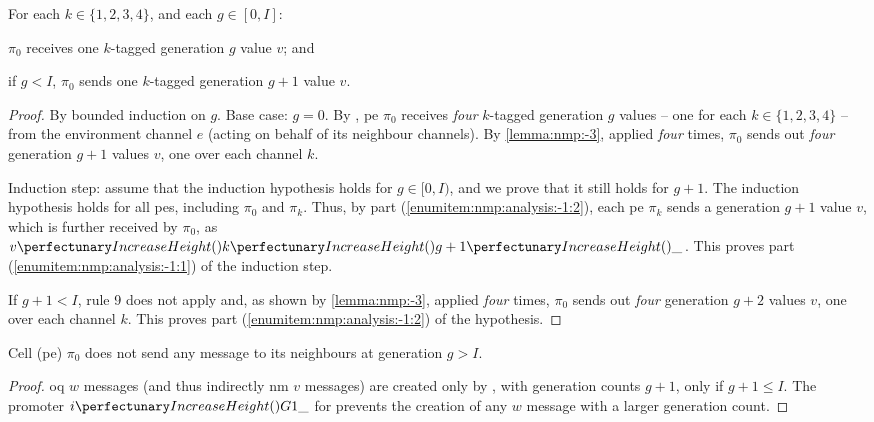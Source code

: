 \begin{theorem}\label{theorem:nmp:-1}
    For each $k \in \{ 1, 2, 3, 4 \}$, and each $g \in [0, I]$:
    \begin{inparaenum}[(i)]
        \item\label{enumitem:nmp:analysis:-1:1} $\pi_0$ receives one $k$-tagged generation $g$ value $v$; and
        \item\label{enumitem:nmp:analysis:-1:2} if $g < I$, $\pi_0$ sends one $k$-tagged generation $g+1$ value $v$.
    \end{inparaenum}
\end{theorem}

\begin{proof}
By bounded induction on $g$. Base case: $g = 0$. By , \gls{pe} $\pi_0$ receives \emph{four} $k$-tagged generation $g$ values -- one for each $k \in \{ 1, 2, 3, 4 \}$ -- from the environment channel $e$ (acting on behalf of its neighbour channels). By \cref{lemma:nmp:-3}, applied \emph{four} times, $\pi_0$ sends out \emph{four} generation $g+1$ values $v$, one over each channel $k$.

Induction step: assume that the induction hypothesis holds for 
$g \in [0, I)$, and we prove that it still holds for $g+1$.
The induction hypothesis holds for all \glspl{pe}, 
including $\pi_0$ and $\pi_k$. 
Thus, by part (\ref{enumitem:nmp:analysis:-1:2}), each \gls{pe} $\pi_k$ sends a generation $g+1$ value $v$, 
which is further received by $\pi_0$, as $\cpvv{k}{g+1}{\cpdiscard}$.
This proves part (\ref{enumitem:nmp:analysis:-1:1}) of the induction step.

If $g+1 < I$, rule 9 does not apply and, 
as shown by \cref{lemma:nmp:-3}, applied \emph{four} times, 
$\pi_0$ sends out \emph{four} generation $g+2$ values $v$, one over each channel $k$.
This proves part (\ref{enumitem:nmp:analysis:-1:2}) of the hypothesis.
\end{proof}

\begin{theorem}\label{theorem:nmp:-2}
    Cell (\gls{pe}) \(\pi_0\) does not send any message to its neighbours at generation \(g > I\).
\end{theorem}

\begin{proof}
    \Gls{oq} \(w\) messages (and thus indirectly \gls{nm} \(v\) messages) are created only by , with generation counts \(g + 1\), only if \(g + 1 \leq I\).  The promoter \(\cpfunc{i}{G1\cpdiscard}\) for  prevents the creation of any \(w\) message with a larger generation count.
\end{proof}

